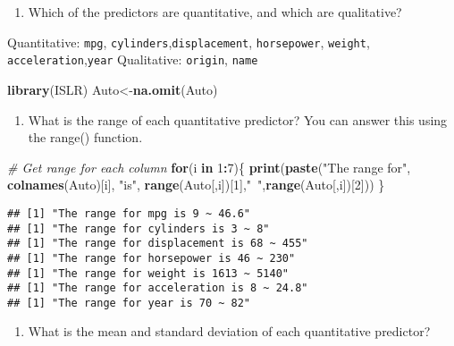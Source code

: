 \documentclass[]{article}
\newenvironment{Shaded}{\begin{snugshade}}{\end{snugshade}}
\newcommand{\KeywordTok}[1]{\textcolor[rgb]{0.13,0.29,0.53}{\textbf{#1}}}
\newcommand{\DecValTok}[1]{\textcolor[rgb]{0.00,0.00,0.81}{#1}}
\newcommand{\StringTok}[1]{\textcolor[rgb]{0.31,0.60,0.02}{#1}}
\newcommand{\CommentTok}[1]{\textcolor[rgb]{0.56,0.35,0.01}{\textit{#1}}}
\newcommand{\ControlFlowTok}[1]{\textcolor[rgb]{0.13,0.29,0.53}{\textbf{#1}}}
\newcommand{\OperatorTok}[1]{\textcolor[rgb]{0.81,0.36,0.00}{\textbf{#1}}}
\newcommand{\NormalTok}[1]{#1}
\providecommand{\tightlist}{%
  \setlength{\itemsep}{0pt}\setlength{\parskip}{0pt}}
\begin{document}
\begin{enumerate}
\def\labelenumi{(\alph{enumi})}
\tightlist
\item
  Which of the predictors are quantitative, and which are qualitative?
\end{enumerate}

Quantitative: \texttt{mpg}, \texttt{cylinders},\texttt{displacement},
\texttt{horsepower}, \texttt{weight},
\texttt{acceleration},\texttt{year} Qualitative: \texttt{origin},
\texttt{name}

\begin{Shaded}
\begin{Highlighting}[]
\KeywordTok{library}\NormalTok{(ISLR)}
\NormalTok{Auto<-}\KeywordTok{na.omit}\NormalTok{(Auto)}
\end{Highlighting}
\end{Shaded}

\begin{enumerate}
\def\labelenumi{(\alph{enumi})}
\setcounter{enumi}{1}
\tightlist
\item
  What is the range of each quantitative predictor? You can answer this
  using the range() function.
\end{enumerate}

\begin{Shaded}
\begin{Highlighting}[]
\CommentTok{# Get range for each column}
\ControlFlowTok{for}\NormalTok{(i }\ControlFlowTok{in} \DecValTok{1}\OperatorTok{:}\DecValTok{7}\NormalTok{)\{}
        \KeywordTok{print}\NormalTok{(}\KeywordTok{paste}\NormalTok{(}\StringTok{"The range for"}\NormalTok{, }\KeywordTok{colnames}\NormalTok{(Auto)[i], }\StringTok{"is"}\NormalTok{, }\KeywordTok{range}\NormalTok{(Auto[,i])[}\DecValTok{1}\NormalTok{],}\StringTok{"~"}\NormalTok{,}\KeywordTok{range}\NormalTok{(Auto[,i])[}\DecValTok{2}\NormalTok{]))}
\NormalTok{        \}}
\end{Highlighting}
\end{Shaded}

\begin{verbatim}
## [1] "The range for mpg is 9 ~ 46.6"
## [1] "The range for cylinders is 3 ~ 8"
## [1] "The range for displacement is 68 ~ 455"
## [1] "The range for horsepower is 46 ~ 230"
## [1] "The range for weight is 1613 ~ 5140"
## [1] "The range for acceleration is 8 ~ 24.8"
## [1] "The range for year is 70 ~ 82"
\end{verbatim}

\begin{enumerate}
\def\labelenumi{(\alph{enumi})}
\setcounter{enumi}{2}
\tightlist
\item
  What is the mean and standard deviation of each quantitative
  predictor?
\end{enumerate}
\end{document}

